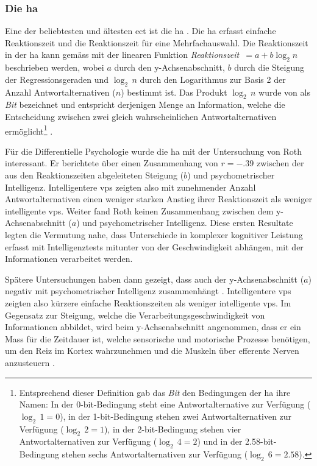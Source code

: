 \documentclass[11pt, twoside, a4paper]{book}		%
\begin{document}
\subsubsection*{Die \gls{ha}}


Eine der beliebtesten und ältesten \gls{ect} ist die \gls{ha} \citep{Hick1952}. Die \gls{ha} erfasst einfache Reaktionszeit und die Reaktionszeit für eine Mehrfachauswahl. 
Die Reaktionszeit in der \gls{ha} kann gemäss \citet[S. 105]{Jensen1987a} mit der linearen Funktion \textit{Reaktionszeit}~$=a+b\log_{2}n$ beschrieben werden, wobei $a$ durch den y-Achsen\-ab\-schnitt, $b$ durch die Steigung der Regres\-sions\-geraden und $\log_{2}\,n$ durch den Logarithmus zur Basis 2 der Anzahl Antwortalternativen ($n$) bestimmt ist. Das Produkt $\log_{2}\,n$ wurde von \citet{Hick1952} als \textit{Bit} bezeichnet und entspricht derjenigen Menge an Information, welche die Entscheidung zwischen zwei gleich wahrscheinlichen Antwortalternativen ermöglicht\footnote{Entsprechend dieser Definition gab das \textit{Bit} den Bedingungen der \gls{ha} ihre Namen: In der 0-bit-Bedingung steht eine Antwortalternative zur Verfügung ($\log_{2}\,1=0$), in der 1-bit-Bedingung stehen zwei Antwortalternativen zur Verfügung ($\log_{2}\,2=1$), in der 2-bit-Bedingung stehen vier Antwortalternativen zur Verfügung ($\log_{2}\,4=2$) und in der 2.58-bit-Bedingung stehen sechs Antwortalternativen zur Verfügung ($\log_{2}\,6=2.58$).} \citep[siehe auch][S. 27]{Jensen2006}.

Für die Differentielle Psychologie wurde die \gls{ha} mit der Untersuchung von Roth \citep[1964; zitiert nach][S. 105]{Jensen1987a} interessant. Er berichtete über einen Zusammenhang von $r=-.39$ zwischen der aus den Reaktionszeiten abgeleiteten Steigung ($b$) und psychometrischer Intelligenz. Intelligentere \glspl{vp} zeigten also mit zunehmender Anzahl Antwortalternativen einen weniger starken Anstieg ihrer Reaktionszeit als weniger intelligente \glspl{vp}. Weiter fand Roth keinen Zusammenhang zwischen dem y-Ach\-sen\-ab\-schnitt ($a$) und psychometrischer Intelligenz. Diese ersten Resultate legten die Vermutung nahe, dass Unterschiede in komplexer kognitiver Leistung erfasst mit Intelligenztests mitunter von der Geschwindigkeit abhängen, mit der Informationen verarbeitet werden.

Spätere Untersuchungen haben dann gezeigt, dass auch der y-Ach\-sen\-ab\-schnitt ($a$) negativ mit psychometrischer Intelligenz zusammenhängt \citep{Jensen1982b, Jensen1987a, Neubauer1997a, Neubauer1997b}. Intelligentere \glspl{vp} zeigten also kürzere einfache Reaktionszeiten als weniger intelligente \glspl{vp}. Im Gegensatz zur Steigung, welche die Verarbeitungsgeschwindigkeit von Informationen abbildet, wird beim y-Ach\-sen\-ab\-schnitt angenommen, dass er ein Mass für die Zeitdauer ist, welche sensorische und motorische Prozesse benötigen, um den Reiz im Kortex wahrzunehmen und die Muskeln über efferente Nerven anzusteuern \citep{Jensen1998a}.
\end{document}
